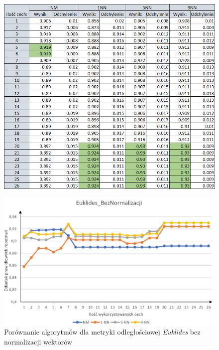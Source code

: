 \documentclass[12pt]{article}
\begin{document}
\begin{figure}[H]
	\centering
		\includegraphics[scale=0.8]{images/algorithms/euklides_beznorm_tab.png}
	
\end{figure}
\begin{figure}[H]
	\centering
		\includegraphics[scale=0.66]{images/algorithms/euklides_beznorm.png}
	\caption{Porównanie algorytmów dla metryki odległościowej \textit{Euklides} bez normalizacji wektorów}
\end{figure}
\end{document}
